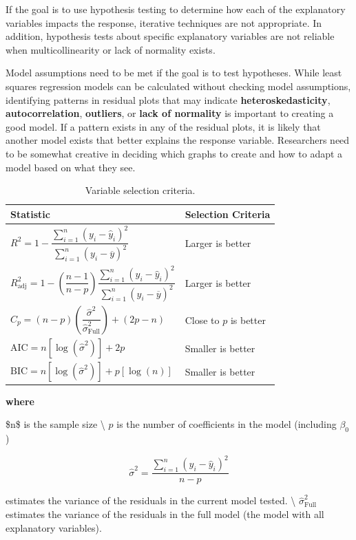 \documentclass[
]{report}
\begin{document}
If the goal is to use hypothesis testing to determine how each of the explanatory variables impacts the response, iterative techniques are not appropriate. In addition, hypothesis tests about specific explanatory variables are not reliable when multicollinearity or lack of normality exists.

Model assumptions need to be met if the goal is to test hypotheses. While least squares regression models can be calculated without checking model assumptions, identifying patterns in residual plots that may indicate \textbf{heteroskedasticity}, \textbf{autocorrelation}, \textbf{outliers}, or \textbf{lack of normality} is important to creating a good model. If a pattern exists in any of the residual plots, it is likely that another model exists that better explains the response variable. Researchers need to be somewhat creative in deciding which graphs to create and how to adapt a model based on what they see.

\begin{table}[!h]
\centering
\caption{\label{tab:tab3}Variable selection criteria.}
\centering
\begin{tabular}[t]{ll}
\toprule
Statistic & Selection Criteria\\
\midrule
$R^2 = 1 - \dfrac{\sum_{i=1}^n (y_i - \hat{y}_i)^2}{\sum_{i=1}^n (y_i - \overline{y})^2}$ & Larger is better\\
$R^2_{\text{adj}} = 1 - \left( \dfrac{n-1}{n-p} \right) \dfrac{\sum_{i=1}^n (y_i - \hat{y}_i)^2}{\sum_{i=1}^n (y_i - \overline{y})^2}$ & Larger is better\\
$C_p = (n-p) \left( \dfrac{\hat{\sigma}^2}{\hat{\sigma}_{\text{Full}}^2} \right) + (2p-n)$ & Close to $p$ is better\\
$\text{AIC} = n[\log(\hat{\sigma}^2)] + 2p$ & Smaller is better\\
$\text{BIC} = n[\log(\hat{\sigma}^2)] + p[\log(n)]$ & Smaller is better\\
\bottomrule
\end{tabular}
\end{table}
\vspace{0.5em}

\textbf{where}

\$n\$ is the sample size \textbackslash{}
\quad \(p\) is the number of coefficients in the model (including \(\beta_0\))

\[
  \hat{\sigma}^2 = \frac{\sum_{i=1}^n (y_i - \hat{y}_i)^2}{n - p}
\]

estimates the variance of the residuals in the current model tested. \textbackslash{}
\(\hat{\sigma}_{\text{Full}}^2\) estimates the variance of the residuals in the full model (the model with all explanatory variables).
\end{document}
